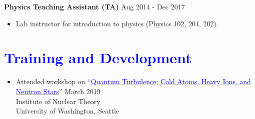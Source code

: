 \documentclass[10pt,fleqn]{scrartcl}
\begin{document}
\textbf{Physics Teaching Assistant (TA)}                                            \hfill Aug 2014 - Dec 2017
\begin{itemize} 
\item Lab instructor for introduction to physics (Physics 102, 201, 202).
\end{itemize}
\noindent

\section*{\textcolor{blue}{Training and Development}}
\begin{itemize}
\item Attended workshop on ``\href{http://www.int.washington.edu/PROGRAMS/19-1a/}
{\textcolor{blue}{Quantum Turbulence: Cold Atoms, Heavy Ions, and Neutron Stars}}'' \hfill March 2019\\
Institute of Nuclear Theory \\ 
University of Washington, Seattle
\end{itemize}
\end{document}
